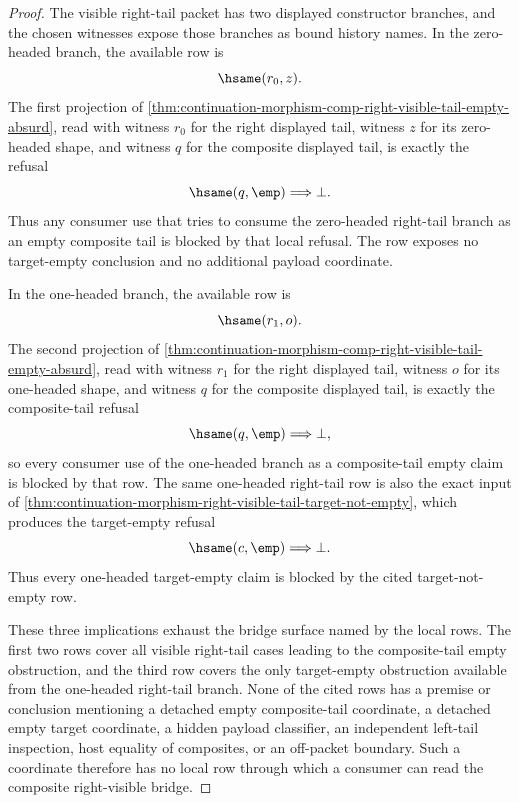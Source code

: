 \begin{proof}
The visible right-tail packet has two displayed constructor branches, and the
chosen witnesses expose those branches as bound history names. In the
zero-headed branch, the available row is
$$
\hsame(r_0,z).
$$
The first projection of
\autoref{thm:continuation-morphism-comp-right-visible-tail-empty-absurd}, read
with witness $r_0$ for the right displayed tail, witness $z$ for its
zero-headed shape, and witness $q$ for the composite displayed tail, is exactly
the refusal
$$
\hsame(q,\emp)
\Longrightarrow \bot.
$$
Thus any consumer use that tries to consume the zero-headed right-tail branch as
an empty composite tail is blocked by that local refusal. The row exposes no
target-empty conclusion and no additional payload coordinate.

In the one-headed branch, the available row is
$$
\hsame(r_1,o).
$$
The second projection of
\autoref{thm:continuation-morphism-comp-right-visible-tail-empty-absurd}, read
with witness $r_1$ for the right displayed tail, witness $o$ for its
one-headed shape, and witness $q$ for the composite displayed tail, is exactly
the composite-tail refusal
$$
\hsame(q,\emp)
\Longrightarrow \bot,
$$
so every consumer use of the one-headed branch as a composite-tail empty claim
is blocked by that row. The same one-headed right-tail row is also the exact
input of
\autoref{thm:continuation-morphism-right-visible-tail-target-not-empty}, which
produces the target-empty refusal
$$
\hsame(c,\emp)
\Longrightarrow \bot.
$$
Thus every one-headed target-empty claim is blocked by the cited
target-not-empty row.

These three implications exhaust the bridge surface named by the local rows.
The first two rows cover all visible right-tail cases leading to the
composite-tail empty obstruction, and the third row covers the only target-empty
obstruction available from the one-headed right-tail branch. None of the cited
rows has a premise or conclusion mentioning a detached empty composite-tail
coordinate, a detached empty target coordinate, a hidden payload classifier, an
independent left-tail inspection, host equality of composites, or an off-packet
boundary. Such a coordinate therefore has no local row through which a consumer
can read the composite right-visible bridge.
\end{proof}

